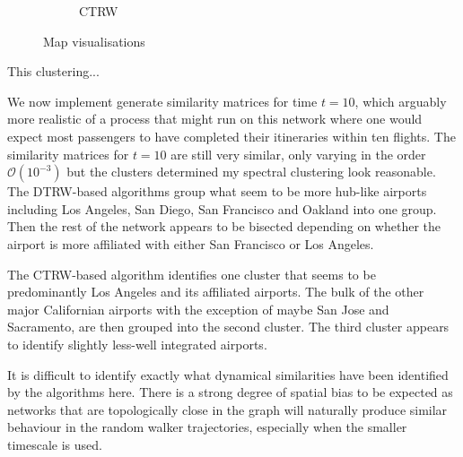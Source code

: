 \documentclass[12pt,a4paper]{article}
\begin{document}
\begin{figure}[H]
\begin{subfigure}[b]{0.5\textwidth}
    \caption{CTRW}
    \label{fig:map_dynsim}
  \end{subfigure}
  \caption{Map visualisations }
  \label{fig:maps}
\end{figure}

\noindent This clustering...

\noindent We now implement generate similarity matrices for time $t=10$, which arguably more realistic of a process that might run on this network where one would expect most passengers to have completed their itineraries within ten flights. The similarity matrices for $t=10$ are still very similar, only varying in the order $\mathcal{O}(10^{-3})$ but the clusters determined my spectral clustering look reasonable. The DTRW-based algorithms group what seem to be more hub-like airports including Los Angeles, San Diego, San Francisco and Oakland into one group. Then the rest of the network appears to be bisected depending on whether the airport is more affiliated with either San Francisco or Los Angeles. \medskip

\noindent The CTRW-based algorithm identifies one cluster that seems to be predominantly Los Angeles and its affiliated airports. The bulk of the other major Californian airports with the exception of maybe San Jose and Sacramento, are then grouped into the second cluster. The third cluster appears to identify slightly less-well integrated airports.

\noindent It is difficult to identify exactly what dynamical similarities have been identified by the algorithms here. There is a strong degree of spatial bias to be expected as networks that are topologically close in the graph will naturally produce similar behaviour in the random walker trajectories, especially when the smaller timescale is used.





\end{document}

